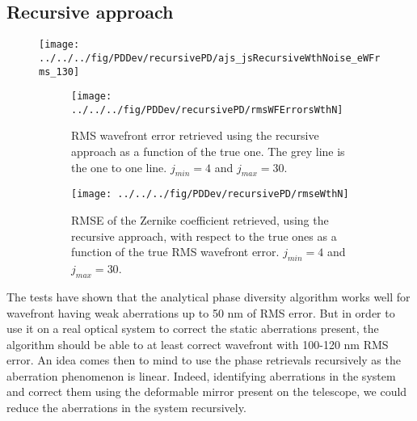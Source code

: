 \subsection{Recursive approach}
\label{subsec:RecApp}

\begin{figure}
\begin{center}
\texttt{[image: ../../../fig/PDDev/recursivePD/ajs\_jsRecursiveWthNoise\_eWFrms\_130]}
\decoRule
\caption{}
\label{fig:ajs_jsRecursiveWthNoise_eWFrms_130}
\end{center}
\end{figure}

\begin{figure}
\centering
    \begin{subfigure}{0.45\textwidth}
        \texttt{[image: ../../../fig/PDDev/recursivePD/rmsWFErrorsWthN]}
        \caption{RMS wavefront error retrieved using the recursive approach as a function of the true one. The grey line is the one to one line. $j_{min}=4$ and $j_{max}=30$.}
        \label{subfig:rmsWFErrorsWthN}
    \end{subfigure}
    \quad
    \begin{subfigure}{0.45\textwidth}
        \texttt{[image: ../../../fig/PDDev/recursivePD/rmseWthN]}
        \caption{RMSE of the Zernike coefficient retrieved, using the recursive approach, with respect to the true ones as a function of the true RMS wavefront error.  $j_{min}=4$ and $j_{max}=30$.}
        \label{subfig:rmseWthN}
    \end{subfigure}
    \decoRule
    \caption{}
\end{figure}

The tests have shown that the analytical phase diversity algorithm works well for wavefront having weak aberrations up to 50 nm of RMS error. But in order to use it on a real optical system to correct the static aberrations present, the algorithm should be able to at least correct wavefront with 100-120 nm RMS error. An idea comes then to mind to use the phase retrievals recursively as the aberration phenomenon is linear. Indeed, identifying aberrations in the system and correct them using the deformable mirror present on the telescope, we could reduce the aberrations in the system recursively.

